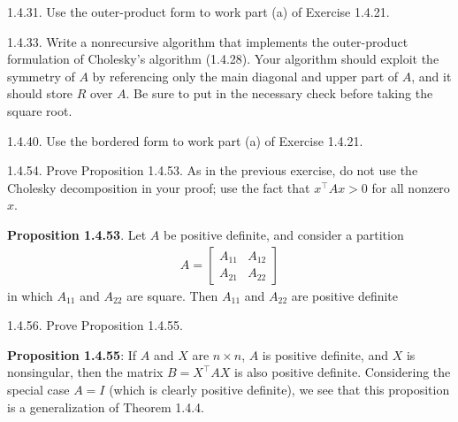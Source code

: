 \documentclass{report}
\begin{document}
    \pagebreak \bigbreak \noindent 
    \begin{mdframed}
        1.4.31. Use the outer-product form to work part (a) of Exercise 1.4.21. 
    \end{mdframed}

    \pagebreak \bigbreak \noindent 
    \begin{mdframed}
        1.4.33. Write a nonrecursive algorithm that implements the outer-product formulation of Cholesky's algorithm (1.4.28). Your algorithm should exploit the symmetry of $A$ by referencing only the main diagonal and upper part of $A$, and it should store $R$ over $A$. Be sure to put in the necessary check before taking the square root.
    \end{mdframed}

    \pagebreak \bigbreak \noindent 
    \begin{mdframed}
        1.4.40. Use the bordered form to work part (a) of Exercise 1.4.21. 
    \end{mdframed}

    \pagebreak \bigbreak \noindent 
    \begin{mdframed}
        1.4.54. Prove Proposition 1.4.53. 
        \bigbreak \noindent 
        As in the previous exercise, do not use the Cholesky decomposition in your proof; use the fact that $x^{\top} A x > 0$ for all nonzero $x$.
    \end{mdframed}
    \bigbreak \noindent 
    \textbf{Proposition 1.4.53}. Let $A $ be positive definite, and consider a partition
    \begin{align*}
        A = \begin{bmatrix} A_{11} & A_{12} \\ A_{21} & A_{22} \end{bmatrix}

    \end{align*}
    in which $A_{11} $ and $A_{22} $ are square. Then $A_{11}$ and $A_{22}$ are positive definite

    \pagebreak  \bigbreak \noindent 
    \begin{mdframed}
        1.4.56. Prove Proposition 1.4.55. 
    \end{mdframed}
    \bigbreak \noindent 
    \textbf{Proposition 1.4.55}: If $A$ and $X$ are $n\times n$, $A$ is positive definite, and $X$ is nonsingular,
    then the matrix $B = X^{\top} A X$ is also positive definite.
    \bigbreak \noindent 
    Considering the special case $A = I$ (which is clearly positive definite), we see that
    this proposition is a generalization of Theorem 1.4.4.
\end{document}

